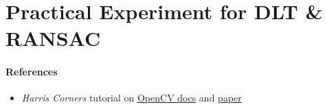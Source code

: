 
\section[Practical Experiment]{Practical Experiment for DLT \& RANSAC}

\paragraph{References}
\begin{itemize}
    \item \emph{Harris Corners} tutorial on \href{https://docs.opencv.org/4.x/dc/d0d/tutorial_py_features_harris.html}{OpenCV docs} and \href{https://doi.org/10.5244/C.2.23}{paper} \cite{harris1988combined}
\end{itemize}
